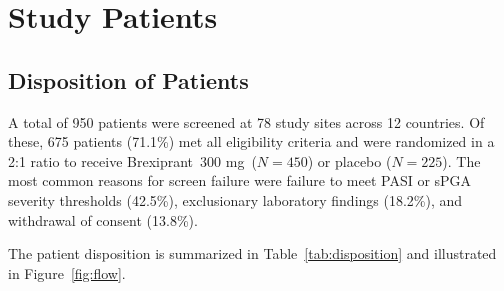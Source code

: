 \documentclass[11pt, a4paper]{article}
\newcommand{\studydrug}{Brexiprant}
\newcommand{\studydose}{300 mg}
\begin{document}
\section{Study Patients}

\subsection{Disposition of Patients}

A total of 950 patients were screened at 78 study sites across 12 countries. Of these, 675 patients (71.1\%) met all eligibility criteria and were randomized in a 2:1 ratio to receive \studydrug\ \studydose\ ($N=450$) or placebo ($N=225$). The most common reasons for screen failure were failure to meet PASI or sPGA severity thresholds (42.5\%), exclusionary laboratory findings (18.2\%), and withdrawal of consent (13.8\%).

\vspace{4pt}
The patient disposition is summarized in Table~\ref{tab:disposition} and illustrated in Figure~\ref{fig:flow}.
\end{document}
